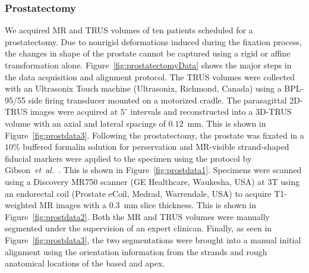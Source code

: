 \documentclass[journal]{IEEEtran}
\begin{document}
\subsubsection{Prostatectomy}\label{sec:data1}
We acquired MR and TRUS volumes of ten patients scheduled for a prostatectomy. Due to nonrigid deformations induced during the fixation process, the changes in shape of the prostate cannot be captured using a rigid or affine transformation alone. Figure~\ref{fig:prostatectomyData} shows the major steps in the data acquisition and alignment protocol. The TRUS volumes were collected with an Ultrasonix Touch machine (Ultrasonix, Richmond, Canada) using a BPL-95/55 side firing transducer mounted on a motorized cradle. The parasagittal 2D-TRUS images were acquired at $5^\circ$ intervals and reconstructed into a 3D-TRUS volume with an axial and lateral spacings of $0.12$~mm. This is shown in Figure~\ref{fig:prostdata3}. Following the prostatectomy, the prostate was fixated in a $10\%$ buffered formalin solution for perservation and MR-visible strand-shaped fiducial markers were applied to the specimen using the protocol by Gibson~\textit{et~al.}~\cite{Gibson12a}. This is shown in Figure~\ref{fig:prostdata1}. Specimens were scanned using a Discovery MR750 scanner (GE Healthcare, Waukesha, USA) at 3T using an endorectal coil (Prostate eCoil, Medrad, Warrendale, USA) to acquire T1-weighted MR images with a $0.3$~mm slice thickness. This is shown in Figure~\ref{fig:prostdata2}. Both the MR and TRUS volumes were manually segmented under the supervision of an expert clinican. Finally, as seen in Figure~\ref{fig:prostdata3}, the two segmentations were brought into a manual initial alignment using the orientation information from the strands and rough anatomical locations of the based and apex.
\end{document}
